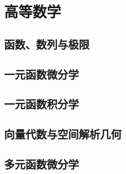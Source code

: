 \part{高等数学}

\chapter{函数、数列与极限}%








\chapter{一元函数微分学}%








% 

\chapter{一元函数积分学}%







% 

\chapter{向量代数与空间解析几何}%





\chapter{多元函数微分学}%

